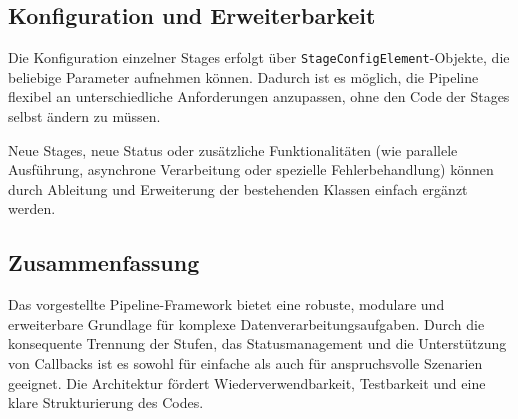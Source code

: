 \documentclass[a4paper]{article} %
\begin{document}
\subsection{Konfiguration und Erweiterbarkeit}

Die Konfiguration einzelner Stages erfolgt über \texttt{StageConfigElement}-Objekte, die beliebige Parameter aufnehmen können. Dadurch ist es möglich, die Pipeline flexibel an unterschiedliche Anforderungen anzupassen, ohne den Code der Stages selbst ändern zu müssen.

Neue Stages, neue Status oder zusätzliche Funktionalitäten (wie parallele Ausführung, asynchrone Verarbeitung oder spezielle Fehlerbehandlung) können durch Ableitung und Erweiterung der bestehenden Klassen einfach ergänzt werden.

\subsection{Zusammenfassung}

Das vorgestellte Pipeline-Framework bietet eine robuste, modulare und erweiterbare Grundlage für komplexe Datenverarbeitungsaufgaben. Durch die konsequente Trennung der Stufen, das Statusmanagement und die Unterstützung von Callbacks ist es sowohl für einfache als auch für anspruchsvolle Szenarien geeignet. Die Architektur fördert Wiederverwendbarkeit, Testbarkeit und eine klare Strukturierung des Codes.
\end{document}
